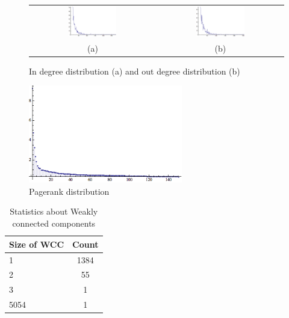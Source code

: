 \begin{figure}[htbf]
\begin{center}
\begin{tabular}{cc}
     \includegraphics[width=0.4\textwidth]{FIG/indegree.png} &
     \includegraphics[width=0.4\textwidth]{FIG/outdegree.png} \\
    (a) & (b) 
\end{tabular}
\caption{In degree distribution (a) and out degree distribution (b)}
\label{fig:results}
\end{center}
\end{figure}

\begin{figure}[htbf]
\begin{center}
     \includegraphics[width=0.6\textwidth]{FIG/pagerank.png}
\caption{Pagerank distribution}
\label{fig:pagerank}
\end{center}
\end{figure}


\begin{table}
\begin{center}
\begin{tabular}{| l | c |}
  \hline                        
  Size of WCC & Count  \\ \hline
  1 & 1384  \\ \hline
  2 & 55  \\ \hline
  3 & 1 \\ \hline
  5054 & 1 \\ \hline  
\end{tabular}
\caption{Statistics about Weakly connected components}
\label{table:wcc}
\end{center}
\end{table}

